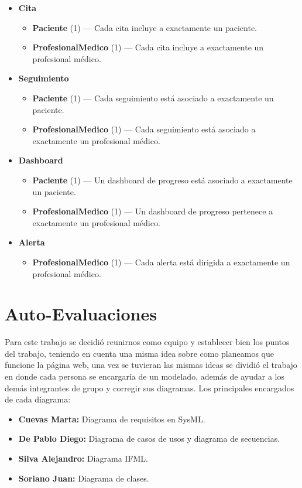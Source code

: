 \documentclass{article}
\begin{document}
\begin{itemize}
	\item \textbf{Cita}
	\begin{itemize}
		\item \textbf{Paciente} (1) — Cada cita incluye a exactamente un paciente.
		\item \textbf{ProfesionalMedico} (1) — Cada cita incluye a exactamente un profesional médico.
	\end{itemize}
	
	\item \textbf{Seguimiento}
	\begin{itemize}
		\item \textbf{Paciente} (1) — Cada seguimiento está asociado a exactamente un paciente.
		\item \textbf{ProfesionalMedico} (1) — Cada seguimiento está asociado a exactamente un profesional médico.
	\end{itemize}
	
	\item \textbf{Dashboard}
	\begin{itemize}
		\item \textbf{Paciente} (1) — Un dashboard de progreso está asociado a exactamente un paciente.
		\item \textbf{ProfesionalMedico} (1) — Un dashboard de progreso pertenece a exactamente un profesional médico.
	\end{itemize}
	
	\item \textbf{Alerta}
	\begin{itemize}
		\item \textbf{ProfesionalMedico} (1) — Cada alerta está dirigida a exactamente un profesional médico.
	\end{itemize}
\end{itemize}


\section{Auto-Evaluaciones}
Para este trabajo se decidió reunirnos como equipo y establecer bien los puntos del trabajo, teniendo en cuenta una misma idea sobre como planeamos que funcione la página web, una vez se tuvieran las mismas ideas se dividió el trabajo en donde cada persona se encargaría de un modelado, además de ayudar a los demás integrantes de grupo y corregir sus diagramas.
Los principales encargados de cada diagrama:
\begin{itemize}
	\item \textbf{Cuevas Marta:} Diagrama de requisitos en SysML.
	\item \textbf{De Pablo Diego:} Diagrama de casos de usos y diagrama de secuencias.
	\item \textbf{Silva Alejandro:} Diagrama IFML.
	\item \textbf{Soriano Juan:} Diagrama de clases.
\end{itemize}
\end{document}
